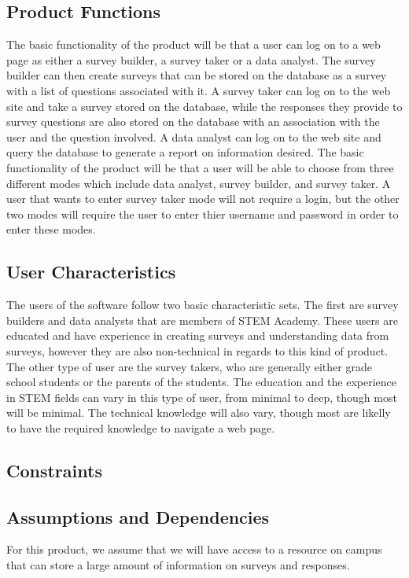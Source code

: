 \documentclass[letterpaper,10pt,titlepage, draftclsnofoot,onecolumn]{IEEEtran}
\begin{document}
\subsection{Product Functions}
The basic functionality of the product will be that a user can log on to a web page as either a survey builder,
a survey taker or a data analyst. The survey builder can then create surveys that can be stored on the database as a survey with a
list of questions associated with it. A survey taker can log on to the web site and take a survey stored on the database,
while the responses they provide to survey questions are also stored on the database with an association with the user
and the question involved. A data analyst can log on to the web site and query the database to generate a report on
information desired.
The basic functionality of the product will be that a user will be able to choose from three different modes which include data analyst, survey builder, and survey taker. 
A user that wants to enter survey taker mode will not require a login, but the other two modes will require the user to enter thier username and password in order to enter these modes. 

\subsection{User Characteristics}
The users of the software follow two basic characteristic sets. The first are survey builders and data analysts that are members of
STEM Academy. These users are educated and have experience in creating surveys and understanding data from surveys,
however they are also non-technical in regards to this kind of product. The other type of user are the survey takers, who are
generally either grade school students or the parents of the students. The education and the experience in STEM fields
can vary in this type of user, from minimal to deep, though most will be minimal. The technical knowledge will also vary, though
most are likelly to have the required knowledge to navigate a web page.
\subsection{Constraints}
\subsection{Assumptions and Dependencies}
For this product, we assume that we will have access to a resource on campus that can store a large amount of information on
surveys and responses. %
\end{document}
